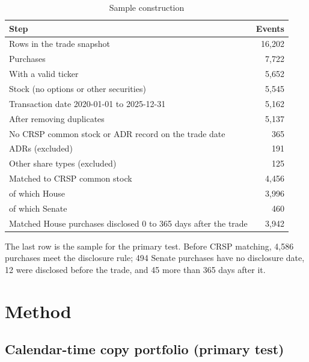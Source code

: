 \documentclass[11pt]{article}
\begin{document}
\begin{table}[t]
\centering
\caption{Sample construction}\label{tab:flow}
\begin{tabular}{lr}
\toprule
Step & Events \\
\midrule
Rows in the trade snapshot & 16,202 \\
Purchases & 7,722 \\
With a valid ticker & 5,652 \\
Stock (no options or other securities) & 5,545 \\
Transaction date 2020-01-01 to 2025-12-31 & 5,162 \\
After removing duplicates & 5,137 \\
\quad No CRSP common stock or ADR record on the trade date & 365 \\
\quad ADRs (excluded) & 191 \\
\quad Other share types (excluded) & 125 \\
Matched to CRSP common stock & 4,456 \\
\quad of which House & 3,996 \\
\quad of which Senate & 460 \\
Matched House purchases disclosed 0 to 365 days after the trade & 3,942 \\
\bottomrule
\end{tabular}

\smallskip
\parbox{0.86\linewidth}{\footnotesize The last row is the sample for the primary test. Before CRSP matching, 4,586 purchases meet the disclosure rule; 494 Senate purchases have no disclosure date, 12 were disclosed before the trade, and 45 more than 365 days after it.}
\end{table}

\section{Method}\label{sec:method}

\subsection{Calendar-time copy portfolio (primary test)}
\end{document}
